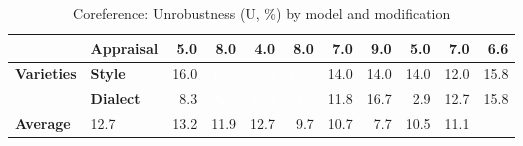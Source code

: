 \begin{table}[h]
{\begin{tabular}{llrrrrrrrrr}
  & \textbf{Appraisal} & \cellcolor{blue!13} 5.0 & \cellcolor{blue!21} 8.0 & \cellcolor{blue!10} 4.0 & \cellcolor{blue!21} 8.0 & \cellcolor{blue!18} 7.0 & \cellcolor{blue!23} 9.0 & \cellcolor{blue!13} 5.0 & \cellcolor{blue!18} 7.0 & \cellcolor{blue!17} 6.6 \\
\midrule
\textbf{Varieties} & \textbf{Style} & \cellcolor{blue!41} 16.0 & \cellcolor{blue!49} \textcolor{white}{19.0} & \cellcolor{blue!46} \textcolor{white}{18.0} & \cellcolor{blue!49} \textcolor{white}{19.0} & \cellcolor{blue!36} 14.0 & \cellcolor{blue!36} 14.0 & \cellcolor{blue!36} 14.0 & \cellcolor{blue!31} 12.0 & \cellcolor{blue!41} 15.8 \\
  & \textbf{Dialect} & \cellcolor{blue!22} 8.3 & \cellcolor{blue!69} \textcolor{white}{26.9} & \cellcolor{blue!57} \textcolor{white}{22.2} & \cellcolor{blue!63} \textcolor{white}{24.5} & \cellcolor{blue!30} 11.8 & \cellcolor{blue!43} 16.7 & \cellcolor{blue!8} 2.9 & \cellcolor{blue!33} 12.7 & \cellcolor{blue!41} 15.8 \\
\midrule
\textbf{Average} &  \cellcolor{blue!33} 12.7 & \cellcolor{blue!34} 13.2 & \cellcolor{blue!31} 11.9 & \cellcolor{blue!33} 12.7 & \cellcolor{blue!25} 9.7 & \cellcolor{blue!28} 10.7 & \cellcolor{blue!20} 7.7 & \cellcolor{blue!27} 10.5 & \cellcolor{blue!29} 11.1 \\
\bottomrule
\end{tabular}}
\caption{Coreference: Unrobustness (U, \%) by model and modification}\label{tab:coref_unrob}
\end{table}